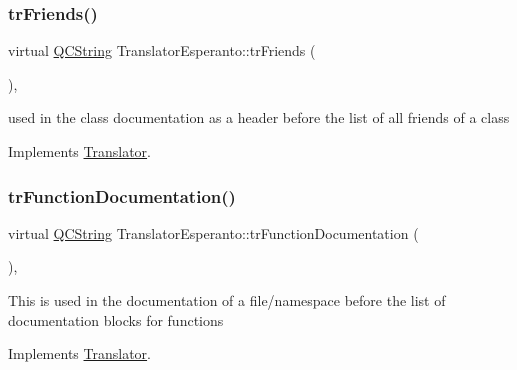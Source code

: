 \mbox{\label{class_translator_esperanto_a6fd48cc860f6c5bb35b02b33046ec4d2}} 
\subsubsection{\texorpdfstring{trFriends()}{trFriends()}}
{\footnotesize\ttfamily virtual \mbox{\hyperlink{class_q_c_string}{Q\+C\+String}} Translator\+Esperanto\+::tr\+Friends (\begin{DoxyParamCaption}{ }\end{DoxyParamCaption})\hspace{0.3cm}{\ttfamily [inline]}, {\ttfamily [virtual]}}

used in the class documentation as a header before the list of all friends of a class 

Implements \mbox{\hyperlink{class_translator}{Translator}}.

\mbox{\label{class_translator_esperanto_ac2f58ec4eed5be0075bc70f79cb5772b}} 
\subsubsection{\texorpdfstring{trFunctionDocumentation()}{trFunctionDocumentation()}}
{\footnotesize\ttfamily virtual \mbox{\hyperlink{class_q_c_string}{Q\+C\+String}} Translator\+Esperanto\+::tr\+Function\+Documentation (\begin{DoxyParamCaption}{ }\end{DoxyParamCaption})\hspace{0.3cm}{\ttfamily [inline]}, {\ttfamily [virtual]}}

This is used in the documentation of a file/namespace before the list of documentation blocks for functions 

Implements \mbox{\hyperlink{class_translator}{Translator}}.

\mbox{\label{class_translator_esperanto_a7187bbeb5e16bf35077cce750936d226}} 

